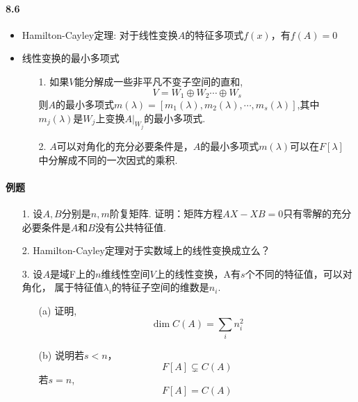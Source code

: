 \paragraph{8.6}
\begin{itemize}
    \item Hamilton-Cayley定理: 对于线性变换$A$的特征多项式$f(x)$，有$f(A)=0$
    \item 线性变换的最小多项式
    \begin{itemize}
        \item [1. ] 如果$V$能分解成一些非平凡不变子空间的直和,
        $$V = W_1 \oplus W_2 \cdots \oplus W_s$$
        则$A$的最小多项式$m(\lambda) = [m_1(\lambda), m_2(\lambda), \cdots, m_s(\lambda)]$,其中
        $m_j(\lambda)$是$W_j$上变换$A|_{W_{j}}$的最小多项式.
        \item [2. ] $A$可以对角化的充分必要条件是，$A$的最小多项式$m(\lambda)$可以在$F[\lambda]$
        中分解成不同的一次因式的乘积.
    \end{itemize}
\end{itemize}

\paragraph{例题}
\begin{itemize}
    \item [1.] 设$A,B$分别是$n,m$阶复矩阵. 证明：矩阵方程$AX-XB=0$只有零解的充分必要条件是$A$和$B$没有公共特征值.
    \vspace{3cm}
    \item [2.] Hamilton-Cayley定理对于实数域上的线性变换成立么？
    \vspace{3cm}
    \item [3.] 设$A$是域F上的$n$维线性空间$V$上的线性变换，A有$s$个不同的特征值，可以对角化，
    属于特征值$\lambda_i$的特征子空间的维数是$n_i$.
    \begin{itemize}
        \item [(a) ] 证明,
        $$\dim C(A) = \sum_{i} n_i^2$$
        \item [(b) ] 说明若$s<n$，
        $$F[A] \subsetneq C(A)$$
        若$s=n$,
        $$F[A] = C(A)$$
    \end{itemize}
\end{itemize}


